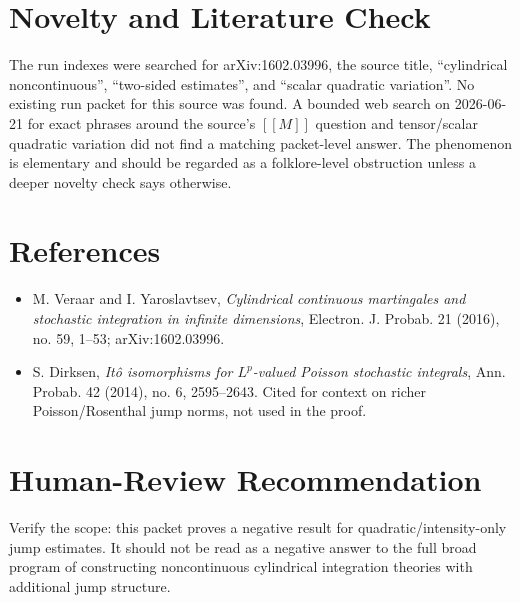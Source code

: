\documentclass[11pt]{article}
\begin{document}
\section*{Novelty and Literature Check}

The run indexes were searched for arXiv:1602.03996, the source title,
``cylindrical noncontinuous'', ``two-sided estimates'', and ``scalar quadratic
variation''.  No existing run packet for this source was found.  A bounded web
search on 2026-06-21 for exact phrases around the source's \( [[M]] \)
question and tensor/scalar quadratic variation did not find a matching
packet-level answer.  The phenomenon is elementary and should be regarded as a
folklore-level obstruction unless a deeper novelty check says otherwise.

\section*{References}

\begin{itemize}
\item M. Veraar and I. Yaroslavtsev, \emph{Cylindrical continuous martingales
and stochastic integration in infinite dimensions}, Electron. J. Probab. 21
(2016), no. 59, 1--53; arXiv:1602.03996.
\item S. Dirksen, \emph{It\^o isomorphisms for \(L^p\)-valued Poisson
stochastic integrals}, Ann. Probab. 42 (2014), no. 6, 2595--2643.  Cited for
context on richer Poisson/Rosenthal jump norms, not used in the proof.
\end{itemize}

\section*{Human-Review Recommendation}

Verify the scope: this packet proves a negative result for
quadratic/intensity-only jump estimates.  It should not be read as a negative
answer to the full broad program of constructing noncontinuous cylindrical
integration theories with additional jump structure.
\end{document}
